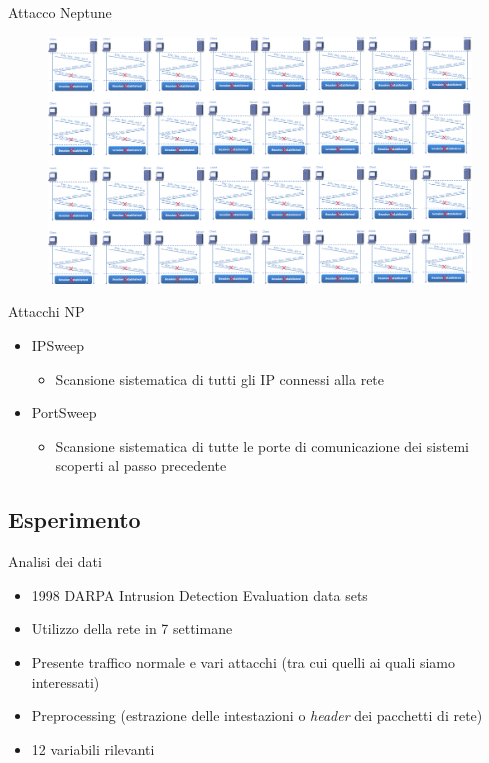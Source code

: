 \documentclass[xcolor={dvipsnames}]{beamer}
\begin{document}
		\begin{frame}{Attacco Neptune}
			\begin{figure}
				\begin{center}
					\includegraphics[width=.9\textwidth]{3wayh8}
				\end{center}
			\end{figure}
		\end{frame}

		\begin{frame}{Attacchi NP}
			\begin{itemize}
				\item IPSweep
				\begin{itemize}
					\item Scansione sistematica di tutti gli IP connessi alla rete
				\end{itemize}
				\item PortSweep
				\begin{itemize}
					\item Scansione sistematica di tutte le porte di comunicazione dei sistemi scoperti al passo precedente
				\end{itemize}
			\end{itemize}
		\end{frame}

	\subsection{Esperimento}

		\begin{frame}{Analisi dei dati}
			\begin{itemize}
				\item 1998 DARPA Intrusion Detection Evaluation data sets
				\item Utilizzo della rete in 7 settimane
				\item Presente traffico normale e vari attacchi (tra cui quelli ai quali siamo interessati)
				\item Preprocessing (estrazione delle intestazioni o \emph{header} dei pacchetti di rete)
				\item 12 variabili rilevanti
			\end{itemize}				
		\end{frame}
		
\end{document}
